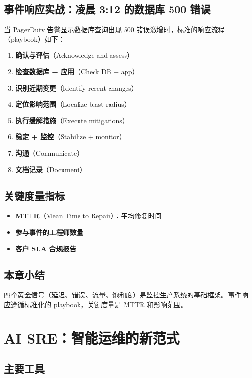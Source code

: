\documentclass[a4paper]{article}
\begin{document}
\subsection{事件响应实战：凌晨 3:12 的数据库 500 错误}

当 PagerDuty 告警显示数据库查询出现 500 错误激增时，标准的响应流程（playbook）如下：

\begin{enumerate}
    \item \textbf{确认与评估}（Acknowledge and assess）
    \item \textbf{检查数据库 + 应用}（Check DB + app）
    \item \textbf{识别近期变更}（Identify recent changes）
    \item \textbf{定位影响范围}（Localize blast radius）
    \item \textbf{执行缓解措施}（Execute mitigations）
    \item \textbf{稳定 + 监控}（Stabilize + monitor）
    \item \textbf{沟通}（Communicate）
    \item \textbf{文档记录}（Document）
\end{enumerate}

\subsection{关键度量指标}

\begin{itemize}
    \item \textbf{MTTR}（Mean Time to Repair）：平均修复时间
    \item \textbf{参与事件的工程师数量}
    \item \textbf{客户 SLA 合规报告}
\end{itemize}

\subsection{本章小结}

四个黄金信号（延迟、错误、流量、饱和度）是监控生产系统的基础框架。事件响应遵循标准化的 playbook，关键度量是 MTTR 和影响范围。

\section{AI SRE：智能运维的新范式}

\subsection{主要工具}
\end{document}
